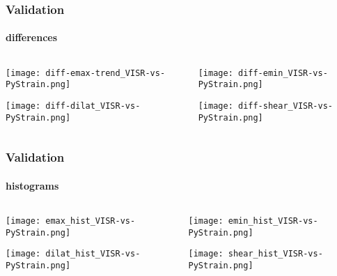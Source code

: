 \begin{frame}
  \frametitle{Validation}
  \framesubtitle{differences}
  \label{ch3:data}
  
  \begin{columns}
    \begin{column}{0.5\textwidth}
     
      \texttt{[image: diff-emax-trend\_VISR-vs-PyStrain.png]}
      
      \texttt{[image: diff-dilat\_VISR-vs-PyStrain.png]}
    \end{column}
    \begin{column}{0.5\textwidth}
    \begin{center}
      
      \texttt{[image: diff-emin\_VISR-vs-PyStrain.png]}
      
      \texttt{[image: diff-shear\_VISR-vs-PyStrain.png]}     
    \end{center}
    \end{column}
  \end{columns}

\end{frame}
\note{}

\begin{frame}
  \frametitle{Validation}
  \framesubtitle{histograms}
  \label{ch3:data}
  
  \begin{columns}
    \begin{column}{0.5\textwidth}
     
      \texttt{[image: emax\_hist\_VISR-vs-PyStrain.png]}
      
      \texttt{[image: dilat\_hist\_VISR-vs-PyStrain.png]}
    \end{column}
    \begin{column}{0.5\textwidth}
    \begin{center}
      
      \texttt{[image: emin\_hist\_VISR-vs-PyStrain.png]}
      
      \texttt{[image: shear\_hist\_VISR-vs-PyStrain.png]}     
    \end{center}
    \end{column}
  \end{columns}

\end{frame}
\note{}



